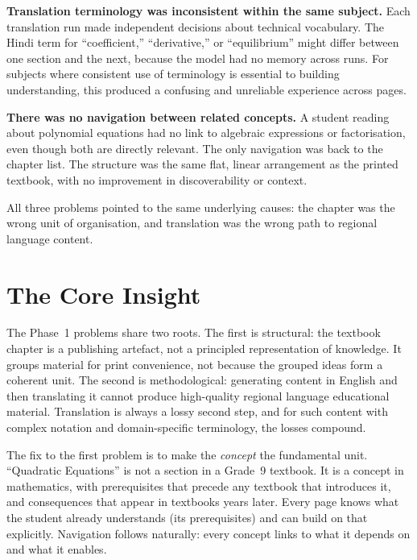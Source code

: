 \documentclass[12pt,a4paper]{article}
\begin{document}
\medskip
\noindent\textbf{Translation terminology was inconsistent within the same subject.}
Each translation run made independent decisions about technical vocabulary.
The Hindi term for ``coefficient,'' ``derivative,'' or ``equilibrium'' might differ
between one section and the next, because the model had no memory across runs.
For subjects where consistent use of terminology is essential to building understanding,
this produced a confusing and unreliable experience across pages.

\medskip
\noindent\textbf{There was no navigation between related concepts.}
A student reading about polynomial equations had no link to algebraic expressions
or factorisation, even though both are directly relevant.
The only navigation was back to the chapter list.
The structure was the same flat, linear arrangement as the printed textbook,
with no improvement in discoverability or context.

\medskip
All three problems pointed to the same underlying causes:
the chapter was the wrong unit of organisation,
and translation was the wrong path to regional language content.

\section{The Core Insight}

The Phase~1 problems share two roots.
The first is structural: the textbook chapter is a publishing artefact,
not a principled representation of knowledge.
It groups material for print convenience, not because the grouped ideas form a coherent unit.
The second is methodological: generating content in English and then translating it
cannot produce high-quality regional language educational material.
Translation is always a lossy second step, and for such content with complex
notation and domain-specific terminology, the losses compound.

The fix to the first problem is to make the \emph{concept} the fundamental unit.
``Quadratic Equations'' is not a section in a Grade~9 textbook.
It is a concept in mathematics, with prerequisites that precede any textbook
that introduces it, and consequences that appear in textbooks years later.
Every page knows what the student already understands (its prerequisites)
and can build on that explicitly.
Navigation follows naturally: every concept links to what it depends on
and what it enables.
\end{document}
